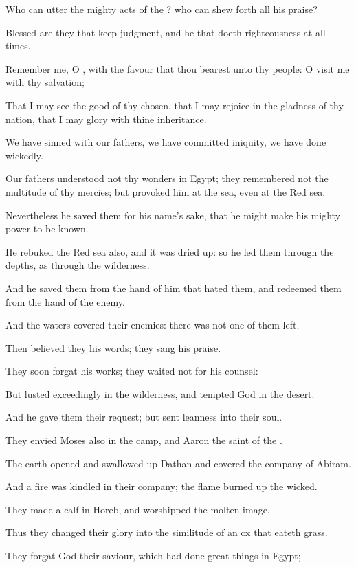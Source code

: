 \verse Who can utter the mighty acts of the \LORD? who can shew forth all his praise?

\verse Blessed are they that keep judgment, and he that doeth righteousness at all times.

\verse Remember me, O \LORD, with the favour that thou bearest unto thy people: O visit me with thy salvation;

\verse That I may see the good of thy chosen, that I may rejoice in the gladness of thy nation, that I may glory with thine inheritance.

\verse We have sinned with our fathers, we have committed iniquity, we have done wickedly.

\verse Our fathers understood not thy wonders in Egypt; they remembered not the multitude of thy mercies; but provoked him at the sea, even at the Red sea.

\verse Nevertheless he saved them for his name's sake, that he might make his mighty power to be known.

\verse He rebuked the Red sea also, and it was dried up: so he led them through the depths, as through the wilderness.

\verse And he saved them from the hand of him that hated them, and redeemed them from the hand of the enemy.

\verse And the waters covered their enemies: there was not one of them left.

\verse Then believed they his words; they sang his praise.

\verse They soon forgat his works; they waited not for his counsel:

\verse But lusted exceedingly in the wilderness, and tempted God in the desert.

\verse And he gave them their request; but sent leanness into their soul.

\verse They envied Moses also in the camp, and Aaron the saint of the \LORD.

\verse The earth opened and swallowed up Dathan and covered the company of Abiram.

\verse And a fire was kindled in their company; the flame burned up the wicked.

\verse They made a calf in Horeb, and worshipped the molten image.

\verse Thus they changed their glory into the similitude of an ox that eateth grass.

\verse They forgat God their saviour, which had done great things in Egypt;

